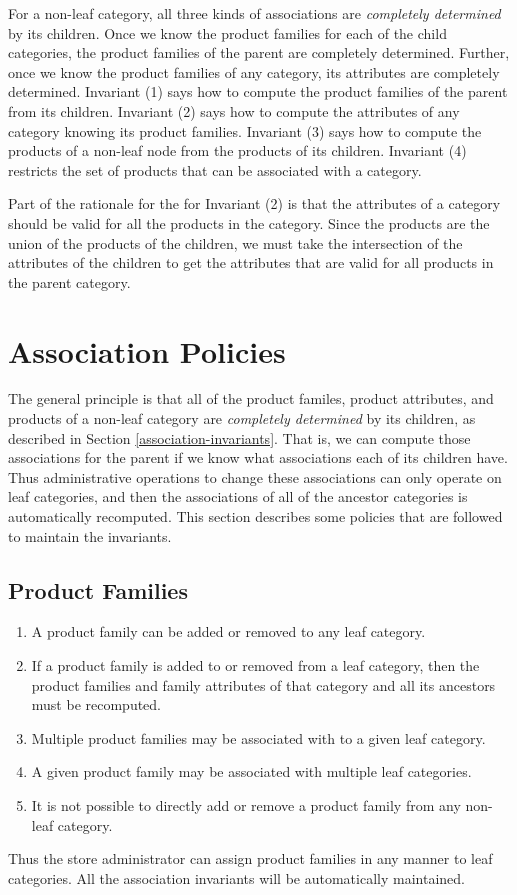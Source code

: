 \documentclass[letterpaper, 12pt]{article}
\begin{document}
\par
For a non-leaf category, all three kinds of associations are {\em completely determined} by its children.  Once we know the product families for each of the child categories, the product families of the parent are completely determined.  Further, once we know the product families of any category, its attributes are  completely determined.   Invariant (1) says how to compute the product families of the parent from its children.  Invariant (2) says how to compute the attributes of any category knowing its product families.  Invariant (3) says how to compute the products of a non-leaf node from the products of its children.  Invariant (4) restricts the set of products that can be associated with a category.
\par
Part of the rationale for the for Invariant (2) is that the attributes of a category should be valid for all the products in the category.  Since the products are the union of the products of the children, we must take the intersection of the attributes of the children to get the attributes that are valid for all products in the parent category.
\section{Association Policies}\label{association-rules}
The general principle is that all of the product familes, product attributes, and products of a non-leaf category are {\em completely determined} by its children, as described in Section \ref{association-invariants}.  That is, we can compute those associations for the parent if we know what associations each of its children have.  Thus administrative operations to change these associations can only operate on leaf categories, and then the associations of all of the ancestor categories is automatically recomputed.  This section describes some policies that are followed to maintain the invariants.
\subsection{Product Families}
\begin{enumerate}
\item A product family can be added or removed to any leaf category.
\item If a product family is added to or removed from  a leaf category, then the product families and family attributes of that category and all its ancestors must be recomputed.
\item Multiple product families may be associated with to a given leaf category.
\item A given product family may be associated with multiple leaf categories.
\item It is not possible to directly add or remove a product family from any non-leaf category.
\end{enumerate}
Thus the store administrator can assign product families in any manner to leaf categories.  All the association invariants will be automatically maintained.
\end{document}
